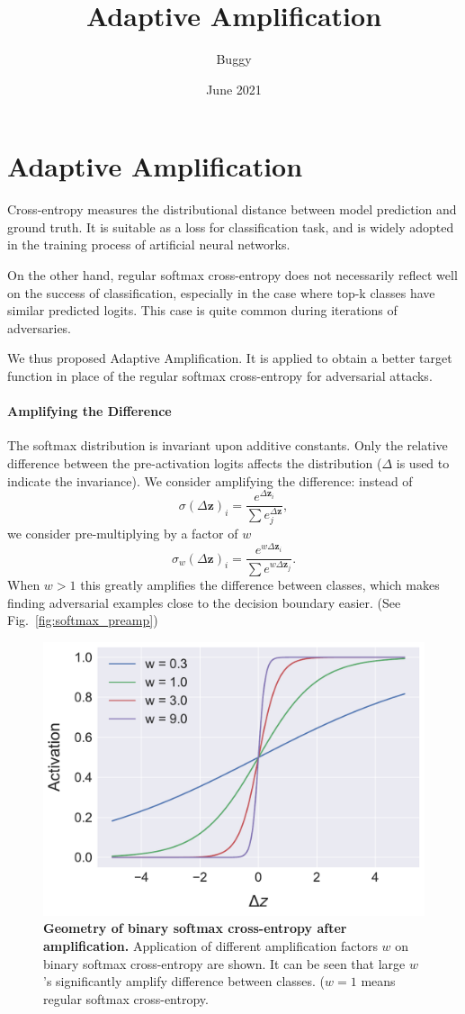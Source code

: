 \documentclass{paper}
\title{Adaptive Amplification}
\author{Buggy}
\date{June 2021}
\begin{document}
\maketitle

\section{Adaptive Amplification}
Cross-entropy measures the distributional distance between model prediction and ground truth. It is suitable as a loss for classification task, and is widely adopted in the training process of artificial neural networks.

On the other hand, regular softmax cross-entropy does not necessarily reflect well on the success of classification, especially in the case where top-k classes have similar predicted logits. This case is quite common during iterations of adversaries.

We thus proposed Adaptive Amplification. It is applied to obtain a better target function in place of the regular softmax cross-entropy for adversarial attacks.

\paragraph{Amplifying the Difference} The softmax distribution is invariant upon additive constants. Only the relative difference between the pre-activation logits affects the distribution ($\Delta$ is used to indicate the invariance). We consider amplifying the difference: instead of
\newcommand{\vdz}{\Delta \mathbf{z}}
\begin{equation}
    \sigma(\vdz)_i = \frac{e^{\vdz_i}}{\sum e^{\vdz}_j},
\end{equation}
we consider pre-multiplying by a factor of $w$
\begin{equation}
    \sigma_w(\vdz)_i = \frac{e^{w\vdz_i}}{\sum e^{w\vdz_j}}.
\end{equation}
When $w > 1$ this greatly amplifies the difference between classes, which makes finding adversarial examples close to the decision boundary easier. (See Fig.\ \ref{fig:softmax_preamp})

\begin{figure}[ht]
    \label{fig:softmax_preamp}
    \centering
    \includegraphics[width=0.5\linewidth]{bin_amp_geo.pdf}
    \caption{\textbf{Geometry of binary softmax cross-entropy after amplification.} Application of different amplification factors $w$ on binary softmax cross-entropy are shown. It can be seen that large $w$'s significantly amplify difference between classes. ($w = 1$ means regular softmax cross-entropy.}
    \label{fig:my_label}
\end{figure}
\end{document}
